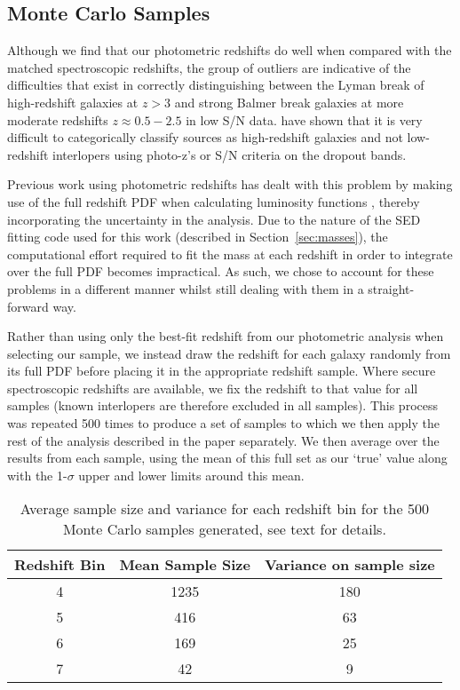 \subsection{Monte Carlo Samples}
Although we find that our photometric redshifts do well when compared with the matched spectroscopic redshifts, the group of outliers are indicative of the difficulties that exist in correctly distinguishing between the Lyman break of high-redshift galaxies at $z > 3$ and strong Balmer break galaxies at more moderate redshifts $z \approx 0.5-2.5$ in low S/N data. \citet{2012ApJ...748..122P,Pirzkal:2013ug} have shown that it is very difficult to categorically classify sources as high-redshift galaxies and not low-redshift interlopers using photo-z's or S/N criteria on the dropout bands.

Previous work using photometric redshifts has dealt with this problem by making use of the full redshift PDF when calculating luminosity functions \citep{2005ApJ...631..126D,2009MNRAS.395.2196M,2012arXiv1212.5222M}, thereby incorporating the uncertainty in the analysis. Due to the nature of the SED fitting code used for this work (described in Section~\ref{sec:masses}), the computational effort required to fit the mass at each redshift in order to integrate over the full PDF becomes impractical. As such, we chose to account for these problems in a different manner whilst still dealing with them in a straight-forward way. 

Rather than using only the best-fit redshift from our photometric analysis when selecting our sample, we instead draw the redshift for each galaxy randomly from its full PDF before placing it in the appropriate redshift sample. Where secure spectroscopic redshifts are available, we fix the redshift to that value for all samples (known interlopers are therefore excluded in all samples). This process was repeated 500 times to produce a set of samples to which we then apply the rest of the analysis described in the paper separately. We then average over the results from each sample, using the mean of this full set as our `true' value along with the 1-$\sigma$ upper and lower limits around this mean. 

\begin{table}
\caption{Average sample size and variance for each redshift bin for the 500 Monte Carlo samples generated, see text for details.}
\label{tab:samplesizes}
\begin{tabular}{@{}ccc}
\hline
 Redshift Bin & Mean Sample Size & Variance on sample size  \\
  \hline
 4 & 1235 & 180 \\
 5 & 416 & 63 \\
 6 & 169 & 25 \\
 7 & 42 & 9 \\
 \hline
\end{tabular}
\end{table}

